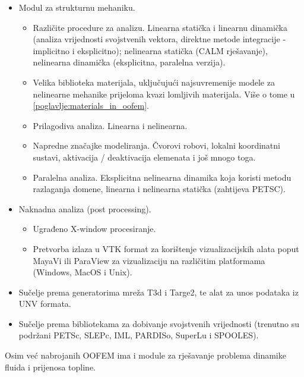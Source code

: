 \documentclass[a4paper,twoside,12pt]{memoir} %
\begin{document}
\begin{itemize}
\begin{itemize}
    \end{itemize}
    \item Modul za strukturnu mehaniku.
        \begin{itemize}
            \item Različite procedure za analizu. Linearna statička i linearnu dinamička (analiza vrijednosti svojstvenih vektora, direktne metode integracije - implicitno i eksplicitno); nelinearna statička (CALM rješavanje), nelinearna dinamička (eksplicitna, paralelna verzija).
            \item Velika biblioteka materijala, uključujući najsuvremenije modele za nelinearne mehanike prijeloma kvazi lomljivih materijala. Više o tome u \ref{poglavlje:materials_in_oofem}.
            \item Prilagodiva analiza. Linearna i nelinearna. 
            \item Napredne značajke modeliranja. Čvorovi robovi, lokalni koordinatni sustavi, aktivacija / deaktivacija elemenata i još mnogo toga.
            \item Paralelna analiza. Eksplicitna nelinearna dinamika koja koristi metodu razlaganja domene, linearna i nelinearna statička (zahtijeva PETSC).
        \end{itemize}
    \item Naknadna analiza (post processing).
        \begin{itemize}
            \item Ugrađeno X-window procesiranje.
            \item Pretvorba izlaza u VTK format za korištenje vizualizacijskih alata poput MayaVi ili ParaView za vizualizaciju na različitim platformama (Windows, MacOS i Unix).
        \end{itemize}
    \item Sučelje prema generatorima mreža T3d i Targe2, te alat za unos podataka iz UNV formata.
    \item Sučelje prema bibliotekama za dobivanje svojstvenih vrijednosti (trenutno su podržani PETSc, SLEPc, IML, PARDISo, SuperLu i SPOOLES). 
\end{itemize}
Osim već nabrojanih OOFEM ima i module za rješavanje problema dinamike fluida i prijenosa topline.
\end{document}
